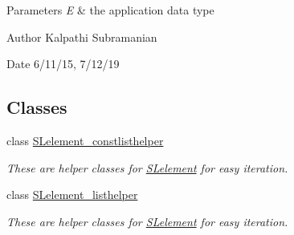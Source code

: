 \begin{DoxyParams}{Parameters}
{\em E} & the application data type\\
\hline
\end{DoxyParams}
\begin{DoxyAuthor}{Author}
Kalpathi Subramanian 
\end{DoxyAuthor}
\begin{DoxyDate}{Date}
6/11/15, 7/12/19 
\end{DoxyDate}
\subsection*{Classes}
\begin{DoxyCompactItemize}
\item 
class \hyperlink{classbridges_1_1datastructure_1_1_s_lelement_1_1_s_lelement__constlisthelper}{S\+Lelement\+\_\+constlisthelper}
\begin{DoxyCompactList}\small\item\em These are helper classes for \hyperlink{classbridges_1_1datastructure_1_1_s_lelement}{S\+Lelement} for easy iteration. \end{DoxyCompactList}\item 
class \hyperlink{classbridges_1_1datastructure_1_1_s_lelement_1_1_s_lelement__listhelper}{S\+Lelement\+\_\+listhelper}
\begin{DoxyCompactList}\small\item\em These are helper classes for \hyperlink{classbridges_1_1datastructure_1_1_s_lelement}{S\+Lelement} for easy iteration. \end{DoxyCompactList}\end{DoxyCompactItemize}
